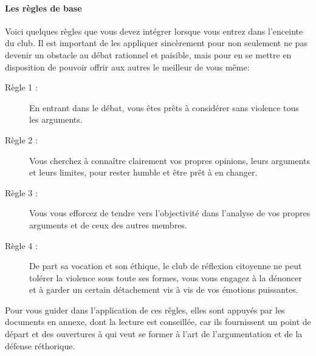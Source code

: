 \documentclass[a4paper,12pt]{article}
\begin{document}
\paragraph{Les règles de base}
Voici quelques règles que vous devez intégrer lorsque vous entrez dans l'enceinte du club. Il est important de les appliquer sincèrement pour non seulement ne pas devenir un obstacle au débat rationnel et paisible, mais pour en se mettre en disposition de pouvoir offrir aux autres le meilleur de vous même:
\begin{description}
 \item[Règle 1 :] En entrant dans le débat, vous êtes prêts à considérer sans violence tous les arguments.
 \item[Règle 2 :] Vous cherchez à connaître clairement vos propres opinions, leurs arguments et leurs limites, pour rester humble et être prêt à en changer.
 \item[Règle 3 :] Vous vous efforcez de tendre vers l'objectivité dans l'analyse de vos propres arguments et de ceux des autres membres.
 \item[Règle 4 :] De part sa vocation et son éthique, le club de réflexion citoyenne ne peut tolérer la violence sous toute ses formes, vous vous engagez à la dénoncer et à garder un certain détachement vis à vis de vos émotions puissantes.
\end{description}
Pour vous guider dans l'application de ces rêgles, elles sont appuyés par les documents en annexe, dont la lecture est conseillée, car ils fournissent un point de départ et des ouvertures à qui veut se former à l'art de l'argumentation et de la défense réthorique. 
\end{document}
